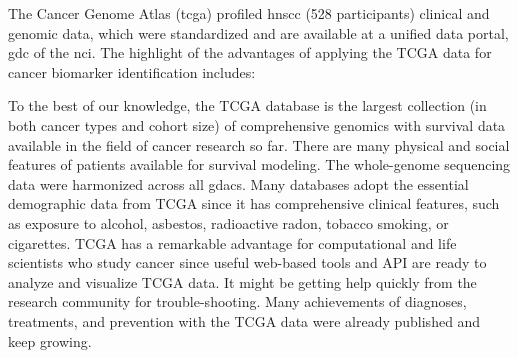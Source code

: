 \documentclass[jpm,article,submit,moreauthors,pdftex]{Definitions/mdpi}
\newenvironment{MyColorPar}[1]{%
    \leavevmode\color{#1}\ignorespaces%
}{%
}%
\begin{document}
The Cancer Genome Atlas (\acrshort{tcga}) profiled \acrshort{hnscc} (528 participants) clinical and genomic data, which were standardized and are available at a unified data portal, \acrfull{gdc} of the \acrfull{nci}.
The highlight of the advantages of applying the TCGA data for cancer biomarker identification includes:
\begin{outline}
\1  To the best of our knowledge, the TCGA database is the largest collection (in both cancer types and cohort size) of comprehensive genomics with survival data available in the field of cancer research so far.  
There are many physical and social features of patients available for survival modeling. %
The whole-genome sequencing data were harmonized across all \acrfull{gdac}s.  Many databases adopt the essential demographic data from TCGA since it has comprehensive clinical features, such as exposure to alcohol, asbestos, radioactive radon, tobacco smoking, or cigarettes.
\1  TCGA has a remarkable advantage for computational and life scientists who study cancer since useful web-based tools and API are ready to analyze and visualize TCGA data. It might be getting help quickly from the research community for trouble-shooting.
\1  Many achievements of diagnoses, treatments, and prevention with the TCGA data were already published and keep growing\cite{Tomczak2015}.\\[0.1cm]
\end{outline}
\end{document}
